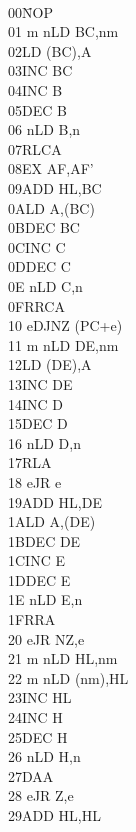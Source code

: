 \setlength\columnsep{4em}
\begin{multicols}{3}
{
	\tt 
	\footnotesize
	\begin{tabbing}
	00{\qquad}{\qquad}{\quad}\=NOP\\
	01 m n\>LD BC,nm\\
	02\>LD (BC),A\\
	03\>INC BC\\
	04\>INC B\\
	05\>DEC B\\
	06 n\>LD B,n\\
	07\>RLCA\\
	08\>EX AF,AF'\\
	09\>ADD HL,BC\\
	0A\>LD A,(BC)\\
	0B\>DEC BC\\
	0C\>INC C\\
	0D\>DEC C\\
	0E n\>LD C,n\\
	0F\>RRCA\\
	10 e\>DJNZ (PC+e)\\
	11 m n\>LD DE,nm\\
	12\>LD (DE),A\\
	13\>INC DE\\
	14\>INC D\\
	15\>DEC D\\
	16 n\>LD D,n\\
	17\>RLA\\
	18 e\>JR e\\
	19\>ADD HL,DE\\
	1A\>LD A,(DE)\\
	1B\>DEC DE\\
	1C\>INC E\\
	1D\>DEC E\\
	1E n\>LD E,n\\
	1F\>RRA\\
	20 e\>JR NZ,e\\
	21 m n\>LD HL,nm\\
	22 m n\>LD (nm),HL\\
	23\>INC HL\\
	24\>INC H\\
	25\>DEC H\\
	26 n\>LD H,n\\
	27\>DAA\\
	28 e\>JR Z,e\\
	29\>ADD HL,HL\\

\end{tabbing}}
\end{multicols}
